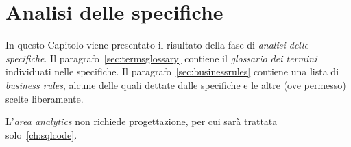 \chapter{Analisi delle specifiche}
In questo Capitolo viene presentato il risultato della fase di {\it analisi delle specifiche}. Il
paragrafo~\vref{sec:termsglossary} contiene il {\it glossario dei termini} individuati
nelle specifiche. %
Il paragrafo~\vref{sec:businessrules} contiene una lista di {\it business rules},
alcune delle quali dettate dalle specifiche e le altre (ove permesso) scelte liberamente.

L'{\it area analytics} non richiede progettazione, per cui sarà trattata solo~\vref{ch:sqlcode}.

%

